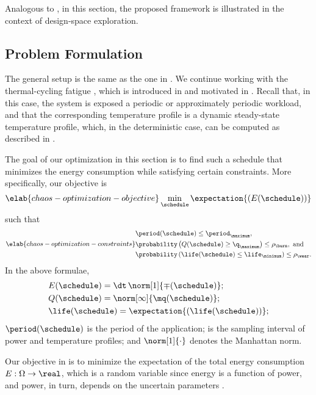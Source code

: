 Analogous to , in this section, the proposed
framework is illustrated in the context of design-space exploration.

\subsection{Problem Formulation}

The general setup is the same as the one in . We
continue working with the thermal-cycling fatigue \cite{jedec2016}, which is
introduced in  and motivated in
. Recall that, in this case, the system is
exposed a periodic or approximately periodic workload, and that the
corresponding temperature profile is a dynamic steady-state temperature profile,
which, in the deterministic case, can be computed as described in
.

The goal of our optimization in this section is to find such a schedule
\schedule that minimizes the energy consumption while satisfying certain
constraints. More specifically, our objective is
\begin{equation} \elab{chaos-optimization-objective}
  \min_{\schedule} \expectation{(E(\schedule))}
\end{equation}
such that
\begin{equation} \elab{chaos-optimization-constraints}
  \begin{split}
    & \period(\schedule) \leq \period_\maximum, \\
    & \probability\left(Q(\schedule) \geq \q_\maximum\right) \leq \rho_\burn, \text{ and} \\
    & \probability\left(\life(\schedule) \leq \life_\minimum\right) \leq \rho_\wear.
  \end{split}
\end{equation}
In the above formulae,
\begin{align*}
  & E(\schedule) = \dt \, \norm[1]{\mp(\schedule)}; \\
  & Q(\schedule) = \norm[\infty]{\mq(\schedule)}; \\
  & \life(\schedule) = \expectation{\left(\life(\schedule)\right)};
\end{align*}
$\period(\schedule)$ is the period of the application; \dt is the sampling
interval of power and temperature profiles; and $\norm[1]{\cdot}$ denotes the
Manhattan norm.

Our objective in  is to minimize the
expectation of the total energy consumption $E: \Omega \to \real$, which is a
random variable since energy is a function of power, and power, in turn, depends
on the uncertain parameters \vu.

